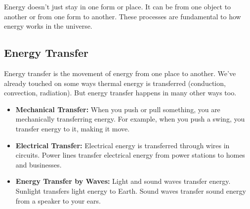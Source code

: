 \FloatBarrier

Energy doesn't just stay in one form or place. It can be  from one object to another or  from one form to another.  These processes are fundamental to how energy works in the universe.

\subsection{Energy Transfer}

Energy transfer is the movement of energy from one place to another. We've already touched on some ways thermal energy is transferred (conduction, convection, radiation).  But energy transfer happens in many other ways too.

\begin{itemize}
    \item \textbf{Mechanical Transfer:}  When you push or pull something, you are mechanically transferring energy.  For example, when you push a swing, you transfer energy to it, making it move.
    \item \textbf{Electrical Transfer:}  Electrical energy is transferred through wires in circuits.  Power lines transfer electrical energy from power stations to homes and businesses.
    \item \textbf{Energy Transfer by Waves:} Light and sound waves transfer energy.  Sunlight transfers light energy to Earth.  Sound waves transfer sound energy from a speaker to your ears.
\end{itemize}

